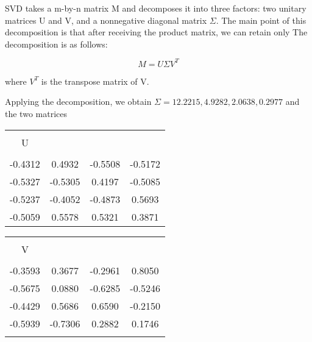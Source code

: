 SVD takes a m-by-n matrix M and decomposes it into three factors: two unitary matrices U and V, and a nonnegative diagonal matrix \(\Sigma \). The main point of this decomposition is that after receiving the product matrix, we can retain only  The decomposition is as follows:

\begin{displaymath}
M = U \Sigma V^T
\end{displaymath}

where \(V^T\) is the transpose matrix of V. 

Applying the decomposition, we obtain \(\Sigma = {12.2215, 4.9282, 2.0638, 0.2977} \) and the two matrices

\noindent\begin{minipage}[t]{\textwidth}
\begin{minipage}[c][5cm][c]{\dimexpr0.5\textwidth-0.5\Colsep\relax}

\begin{tabular}{c c c c}
\hline\hline \\
U \\
\hline \\
-0.4312 & 0.4932 & -0.5508 & -0.5172 \\
-0.5327 & -0.5305 & 0.4197 & -0.5085 \\
-0.5237 & -0.4052 & -0.4873 & 0.5693 \\
-0.5059 & 0.5578 & 0.5321 & 0.3871 \\
\hline\hline
\end{tabular}

\end{minipage}\hfill
\begin{minipage}[c][5cm][c]{\dimexpr0.5\textwidth-0.5\Colsep\relax}

\begin{tabular}{c c c c}
\hline\hline \\
V \\
\hline \\
-0.3593 & 0.3677 & -0.2961 & 0.8050 \\
-0.5675 & 0.0880 & -0.6285 & -0.5246 \\
-0.4429 & 0.5686 & 0.6590 & -0.2150 \\
-0.5939 & -0.7306 & 0.2882 & 0.1746 \\
\hline\hline \\
\end{tabular}
\end{minipage}%
\end{minipage}



